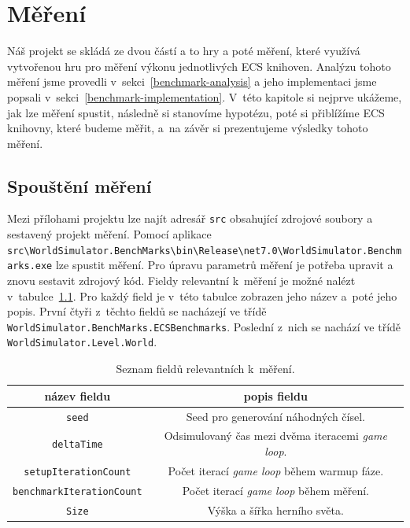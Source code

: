 \chapter{Měření}
\label{chap:benchmark}
Náš projekt se skládá ze dvou částí a to hry a poté měření, které využívá vytvořenou hru pro měření výkonu jednotlivých ECS knihoven. Analýzu tohoto měření jsme provedli v~sekci~\ref{benchmark-analysis} a jeho implementaci jsme popsali v~sekci~\ref{benchmark-implementation}. V~této kapitole si nejprve ukážeme, jak lze měření spustit, následně si stanovíme hypotézu, poté si přiblížíme ECS knihovny, které budeme měřit, a~na závěr si prezentujeme výsledky tohoto měření.

\section{Spouštění měření}
Mezi přílohami projektu lze najít adresář \texttt{src} obsahující zdrojové soubory a sestavený projekt měření. Pomocí aplikace \texttt{src\textbackslash WorldSimulator.BenchMarks\textbackslash bin\textbackslash \linebreak Release\textbackslash net7.0\textbackslash WorldSimulator.Benchmarks.exe} lze spustit měření. Pro úpravu parametrů měření je potřeba upravit a znovu sestavit zdrojový kód. Fieldy relevantní k~měření je možné nalézt v~tabulce~\ref{tab:benchmark-relevant-fields}. Pro každý field je v~této tabulce zobrazen jeho název a~poté jeho popis. První čtyři z~těchto fieldů se nacházejí ve třídě \texttt{WorldSimulator.BenchMarks.ECSBenchmarks}. Poslední z~nich se nachází ve třídě \texttt{WorldSimulator.Level.World}.

\begin{table}[!htb]
    \centering\footnotesize\sf
    \begin{tabular}{c c}
        \toprule
        název fieldu & popis fieldu \\
        \midrule

        \texttt{seed} & Seed pro generování náhodných čísel. \\

        \texttt{deltaTime} & Odsimulovaný čas mezi dvěma iteracemi \textit{game loop}. \\

        \texttt{setupIterationCount} & Počet iterací \textit{game loop} během warmup fáze. \\

        \texttt{benchmarkIterationCount} & Počet iterací \textit{game loop} během měření. \\

        \texttt{Size} & Výška a šířka herního světa. \\
        \bottomrule
    \end{tabular}
    \caption{Seznam fieldů relevantních k~měření.}
    \label{tab:benchmark-relevant-fields}
\end{table}

